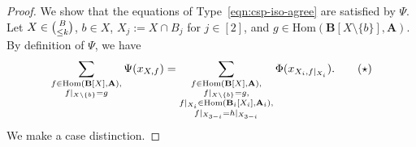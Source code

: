 \documentclass[a4paper,english, thm-restate]{lipics-v2021}
\DeclarePairedDelimiter\set{\lbrace}{\rbrace}
\newcommand{\StructA}{\mathbf{A}}
\newcommand{\StructB}{\mathbf{B}}
\newcommand{\restrict}[2]{#1|_{#2}}
\newcommand{\Hom}[2]{\mathrm{Hom}(#1,#2)}
\begin{document}
	\begin{proof}
		We show that the equations of Type~\ref{eqn:csp-iso-agree} are satisfied by $\Psi$.
		Let $X \in \tbinom{B}{\leq k}$, $b \in X$, $X_j := X \cap B_j$ for $j\in[2]$,  and $g \in \Hom{\StructB[X \setminus \{b\}]}{ \StructA}$. By definition of $\Psi$, we have
		\begin{align*}
			\sum_{\substack{f \in \Hom{\StructB[X]}{\StructA},\\\restrict{f}{X\setminus \set{b}} = g}} \Psi(x_{X,f}) = 
			\sum_{\substack{f \in \Hom{\StructB[X]}{\StructA},\\\restrict{f}{X\setminus \set{b}} = g,\\
					\restrict{f}{X_i} \in \Hom{\StructB_i[X_i]}{\StructA_i},\\
					\restrict{f}{X_{3-i}} = \restrict{h}{X_{3-i}}
			}}
			\Phi(x_{X_i,\restrict{f}{X_i}}). \tag{$\star$}
		\end{align*}
		We make a case distinction.
		

\end{proof}
\end{document}
